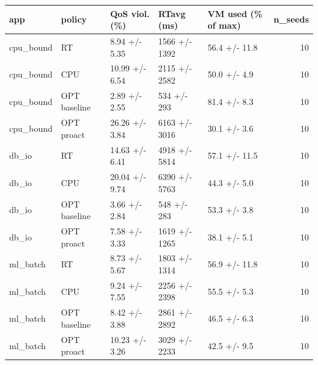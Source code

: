 \begin{tabular}{lllllr}
\toprule
app & policy & QoS viol. (\%) & RTavg (ms) & VM used (\% of max) & n\_seeds \\
\midrule
cpu\_bound & RT & 8.94 +/- 5.35 & 1566 +/- 1392 & 56.4 +/- 11.8 & 10 \\
cpu\_bound & CPU & 10.99 +/- 6.54 & 2115 +/- 2582 & 50.0 +/- 4.9 & 10 \\
cpu\_bound & OPT baseline & 2.89 +/- 2.55 & 534 +/- 293 & 81.4 +/- 8.3 & 10 \\
cpu\_bound & OPT proact & 26.26 +/- 3.84 & 6163 +/- 3016 & 30.1 +/- 3.6 & 10 \\
db\_io & RT & 14.63 +/- 6.41 & 4918 +/- 5814 & 57.1 +/- 11.5 & 10 \\
db\_io & CPU & 20.04 +/- 9.74 & 6390 +/- 5763 & 44.3 +/- 5.0 & 10 \\
db\_io & OPT baseline & 3.66 +/- 2.84 & 548 +/- 283 & 53.3 +/- 3.8 & 10 \\
db\_io & OPT proact & 7.58 +/- 3.33 & 1619 +/- 1265 & 38.1 +/- 5.1 & 10 \\
ml\_batch & RT & 8.73 +/- 5.67 & 1803 +/- 1314 & 56.9 +/- 11.8 & 10 \\
ml\_batch & CPU & 9.24 +/- 7.55 & 2256 +/- 2398 & 55.5 +/- 5.3 & 10 \\
ml\_batch & OPT baseline & 8.42 +/- 3.88 & 2861 +/- 2892 & 46.5 +/- 6.3 & 10 \\
ml\_batch & OPT proact & 10.23 +/- 3.26 & 3029 +/- 2233 & 42.5 +/- 9.5 & 10 \\
\bottomrule
\end{tabular}
